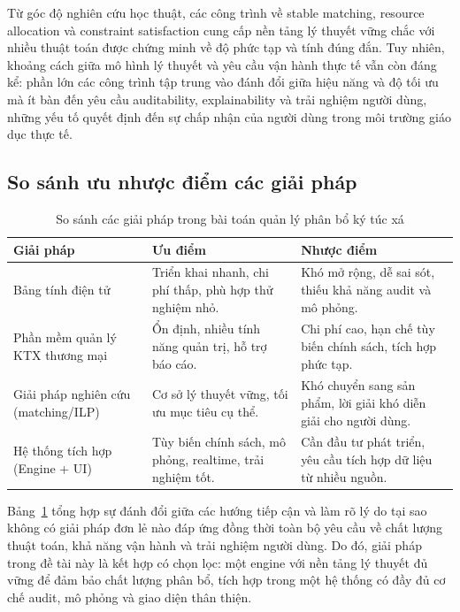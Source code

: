 ﻿\documentclass[a4paper,12pt,openany,oneside]{report}
\begin{document}
Từ góc độ nghiên cứu học thuật, các công trình về stable matching, resource
allocation và constraint satisfaction cung cấp nền tảng lý thuyết vững chắc với
nhiều thuật toán được chứng minh về độ phức tạp và tính đúng đắn. Tuy nhiên,
khoảng cách giữa mô hình lý thuyết và yêu cầu vận hành thực tế vẫn còn đáng kể:
phần lớn các công trình tập trung vào đánh đổi giữa hiệu năng và độ tối ưu mà ít
bàn đến yêu cầu auditability, explainability và trải nghiệm người dùng, những
yếu tố quyết định đến sự chấp nhận của người dùng trong môi trường giáo dục thực
tế.

\subsection{So sánh ưu nhược điểm các giải pháp}

\begin{table}[htbp]
\centering
\caption{So sánh các giải pháp trong bài toán quản lý phân bổ ký túc xá}
\label{tab:comparison}
\renewcommand{\arraystretch}{1.5}
\begin{tabular}{p{4.0cm} p{4.8cm} p{4.8cm}}
\toprule
\textbf{Giải pháp} & \textbf{Ưu điểm} & \textbf{Nhược điểm} \\
\midrule
Bảng tính điện tử
  & Triển khai nhanh, chi phí thấp, phù hợp thử nghiệm nhỏ.
  & Khó mở rộng, dễ sai sót, thiếu khả năng audit và mô phỏng. \\
Phần mềm quản lý KTX thương mại
  & Ổn định, nhiều tính năng quản trị, hỗ trợ báo cáo.
  & Chi phí cao, hạn chế tùy biến chính sách, tích hợp phức tạp. \\
Giải pháp nghiên cứu (matching/ILP)
  & Cơ sở lý thuyết vững, tối ưu mục tiêu cụ thể.
  & Khó chuyển sang sản phẩm, lời giải khó diễn giải cho người dùng. \\
Hệ thống tích hợp (Engine + UI)
  & Tùy biến chính sách, mô phỏng, realtime, trải nghiệm tốt.
  & Cần đầu tư phát triển, yêu cầu tích hợp dữ liệu từ nhiều nguồn. \\
\bottomrule
\end{tabular}
\end{table}

Bảng~\ref{tab:comparison} tổng hợp sự đánh đổi giữa các hướng tiếp cận và làm
rõ lý do tại sao không có giải pháp đơn lẻ nào đáp ứng đồng thời toàn bộ yêu
cầu về chất lượng thuật toán, khả năng vận hành và trải nghiệm người dùng. Do đó,
giải pháp trong đề tài này là kết hợp có chọn lọc: một engine với nền tảng lý
thuyết đủ vững để đảm bảo chất lượng phân bổ, tích hợp trong một hệ thống có
đầy đủ cơ chế audit, mô phỏng và giao diện thân thiện.
\end{document}
